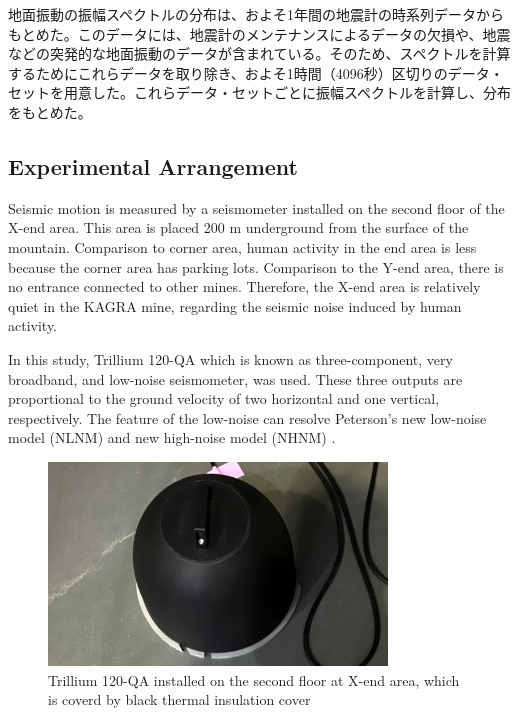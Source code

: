 地面振動の振幅スペクトルの分布は、およそ1年間の地震計の時系列データからもとめた。このデータには、地震計のメンテナンスによるデータの欠損や、地震などの突発的な地面振動のデータが含まれている。そのため、スペクトルを計算するためにこれらデータを取り除き、およそ1時間（4096秒）区切りのデータ・セットを用意した。これらデータ・セットごとに振幅スペクトルを計算し、分布をもとめた。

\subsection{Experimental Arrangement}
Seismic motion is measured by a seismometer installed on the second floor of the X-end area. This area is placed 200 $\mathrm{m}$ underground from the surface of the mountain. Comparison to corner area, human activity in the end area is less because the corner area has parking lots. Comparison to the Y-end area, there is no entrance connected to other mines. Therefore, the X-end area is relatively quiet in the KAGRA mine, regarding the seismic noise induced by human activity.

In this study, Trillium 120-QA which is known as three-component, very broadband, and low-noise seismometer, was used. These three outputs are proportional to the ground velocity of two horizontal and one vertical, respectively. The feature of the low-noise can resolve  Peterson's new low-noise model (NLNM) and new high-noise model (NHNM) \cite{peterson1993observations}.

\begin{figure}[H]
  \begin{center}   
    \includegraphics[width=9.0cm]{./img_chap3/img316.png}
    \caption{Trillium 120-QA installed on the second floor at X-end area, which is coverd by black thermal insulation cover}\label{img:img316}
  \end{center}
\end{figure}

